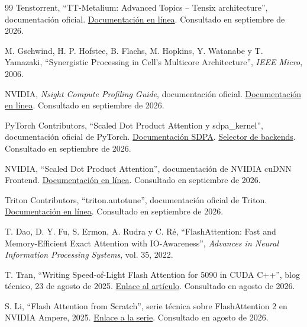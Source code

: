 \begin{thebibliography}{99}
Tenstorrent,
``TT-Metalium: Advanced Topics -- Tensix architecture'', documentación oficial.
\href{https://docs.tenstorrent.com/tt-metal/latest/tt-metalium/tt_metal/advanced_topics/index.html}{Documentación en línea}.
Consultado en septiembre de 2026.

M. Gschwind, H. P. Hofstee, B. Flachs, M. Hopkins, Y. Watanabe y T. Yamazaki,
``Synergistic Processing in Cell's Multicore Architecture'',
\textit{IEEE Micro}, 2006.

NVIDIA,
\textit{Nsight Compute Profiling Guide}, documentación oficial.
\href{https://docs.nvidia.com/nsight-compute/ProfilingGuide/}{Documentación en línea}.
Consultado en septiembre de 2026.

PyTorch Contributors,
``Scaled Dot Product Attention y sdpa\_kernel'', documentación oficial de PyTorch.
\href{https://docs.pytorch.org/docs/main/generated/torch.nn.functional.scaled_dot_product_attention.html}{Documentación SDPA}.
\href{https://docs.pytorch.org/docs/main/generated/torch.nn.attention.sdpa_kernel.html}{Selector de backends}.
Consultado en septiembre de 2026.

NVIDIA,
``Scaled Dot Product Attention'', documentación de NVIDIA cuDNN Frontend.
\href{https://docs.nvidia.com/deeplearning/cudnn/frontend/latest/operations/Attention.html}{Documentación en línea}.
Consultado en septiembre de 2026.

Triton Contributors,
``triton.autotune'', documentación oficial de Triton.
\href{https://triton-lang.org/main/python-api/generated/triton.autotune.html}{Documentación en línea}.
Consultado en septiembre de 2026.


T. Dao, D. Y. Fu, S. Ermon, A. Rudra y C. Ré,
``FlashAttention: Fast and Memory-Efficient Exact Attention with IO-Awareness'',
\textit{Advances in Neural Information Processing Systems}, vol. 35, 2022.

T. Tran,
``Writing Speed-of-Light Flash Attention for 5090 in CUDA C++'',
blog técnico, 23 de agosto de 2025.
\href{https://gau-nernst.github.io/fa-5090/}{Enlace al artículo}.
Consultado en agosto de 2026.

S. Li,
``Flash Attention from Scratch'',
serie técnica sobre FlashAttention 2 en NVIDIA Ampere, 2025.
\href{https://lubits.ch/flash/}{Enlace a la serie}.
Consultado en agosto de 2026.


\end{thebibliography}
